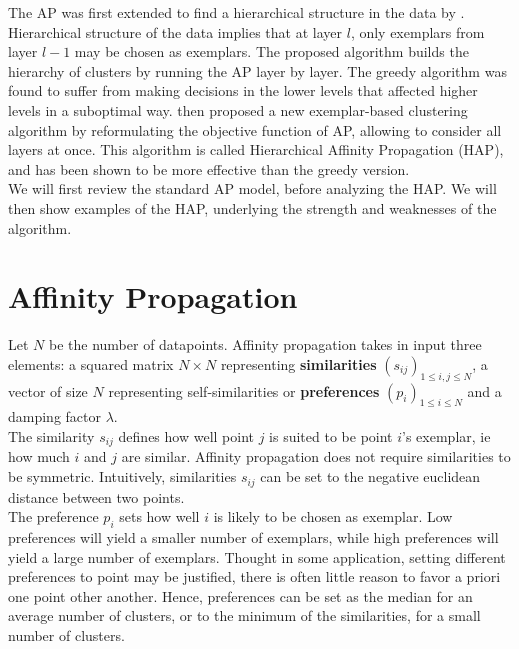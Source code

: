 \documentclass{ipol}
\begin{document}
The AP was first extended to find a hierarchical structure in the data by
\cite{Xiao07jointaffinity}. Hierarchical structure of the data implies that at
layer $l$, only exemplars from layer $l - 1$ may be chosen as exemplars. The
proposed algorithm builds the hierarchy of clusters by running the AP layer by
layer. The greedy algorithm was found to suffer from making decisions in the
lower levels that affected higher levels in a suboptimal way. \cite{hap} then
proposed a new exemplar-based clustering algorithm by reformulating the
objective function of AP, allowing to consider all layers at once. This
algorithm is called Hierarchical Affinity Propagation (HAP), and has been
shown to be more effective than the greedy version. \\

We will first review the standard AP model, before analyzing the HAP. We will
then show examples of the HAP, underlying the strength and weaknesses of the
algorithm.

\section{Affinity Propagation}

Let $N$ be the number of datapoints. Affinity propagation takes in input three
elements: a squared matrix $N \times N$ representing \textbf{similarities}
$(s_{ij})_{1 \leq i, j \leq N}$, a vector of size $N$ representing
self-similarities or \textbf{preferences} $(p_i)_{1 \leq i \leq N}$ and a
damping factor $\lambda$. \\

The similarity $s_{ij}$ defines how well point $j$ is suited to be point $i$'s
exemplar, ie how much $i$ and $j$ are similar. Affinity propagation does not
require similarities to be symmetric. Intuitively, similarities $s_{ij}$ can
be set to the negative euclidean distance between two points. \\

The preference $p_i$ sets how well $i$ is likely to be chosen as exemplar. Low
preferences will yield a smaller number of exemplars, while high preferences
will yield a large number of exemplars. Thought in some application, setting
different preferences to point may be justified, there is often little reason
to favor a priori one point other another. Hence, preferences can be set as
the median for an average number of clusters, or to the minimum of the
similarities, for a small number of clusters. \\
\end{document}
